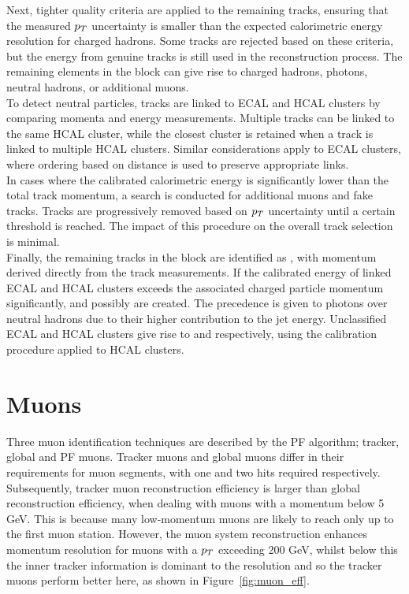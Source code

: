 Next, tighter quality criteria are applied to the remaining tracks, ensuring that the measured $p_{T}$ uncertainty is smaller than the expected calorimetric energy resolution for charged hadrons. 
Some tracks are rejected based on these criteria, but the energy from genuine tracks is still used in the reconstruction process. 
The remaining elements in the block can give rise to charged hadrons, photons, neutral hadrons, or additional muons. \\

To detect neutral particles, tracks are linked to \ac{ECAL} and \ac{HCAL} clusters by comparing momenta and energy measurements. 
Multiple tracks can be linked to the same \ac{HCAL} cluster, while the closest cluster is retained when a track is linked to multiple \ac{HCAL} clusters. 
Similar considerations apply to \ac{ECAL} clusters, where ordering based on distance is used to preserve appropriate links. \\

In cases where the calibrated calorimetric energy is significantly lower than the total track momentum, a search is conducted for additional muons and fake tracks. 
Tracks are progressively removed based on $p_{T}$ uncertainty until a certain threshold is reached. 
The impact of this procedure on the overall track selection is minimal. \\

Finally, the remaining tracks in the block are identified as , with momentum derived directly from the track measurements. 
If the calibrated energy of linked \ac{ECAL} and \ac{HCAL} clusters exceeds the associated charged particle momentum significantly,  and possibly  are created. 
The precedence is given to photons over neutral hadrons due to their higher contribution to the jet energy. 
Unclassified \ac{ECAL} and \ac{HCAL} clusters give rise to  and  respectively, using the calibration procedure applied to \ac{HCAL} clusters.

\section{Muons}

Three muon identification techniques are described by the \ac{PF} algorithm; tracker, global and \ac{PF} muons.
Tracker muons and global muons differ in their requirements for muon segments, with one and two hits required respectively. 
Subsequently, tracker muon reconstruction efficiency is larger than global reconstruction efficiency, when dealing with muons with a momentum below 5 GeV. 
This is because many low-momentum muons are likely to reach only up to the first muon station. 
However, the muon system reconstruction enhances momentum resolution for muons with a $p_{T}$ exceeding 200 GeV, whilst below this the inner tracker information is dominant to the resolution and so the tracker muons perform better here, as shown in Figure~\ref{fig:muon_eff}. \\

